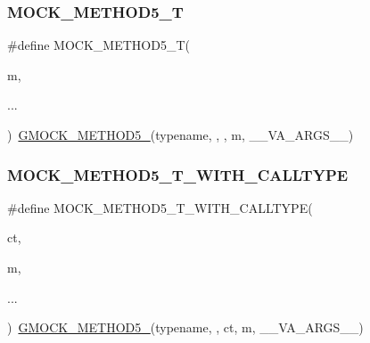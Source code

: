 \mbox{\label{_obj__test_2lib_2googletest-master_2googlemock_2include_2gmock_2gmock-generated-function-mockers_8h_a3566f9bd057c5cee1841f55cbf685947}} 
\subsubsection{\texorpdfstring{MOCK\_METHOD5\_T}{MOCK\_METHOD5\_T}}
{\footnotesize\ttfamily \#define M\+O\+C\+K\+\_\+\+M\+E\+T\+H\+O\+D5\+\_\+T(\begin{DoxyParamCaption}\item[{}]{m,  }\item[{}]{... }\end{DoxyParamCaption})~\mbox{\hyperlink{_obj__test_2lib_2googletest-release-1_88_81_2googlemock_2include_2gmock_2gmock-generated-function-mockers_8h_a9e3ecd392499ab19a4a6d3adcabf56f6}{G\+M\+O\+C\+K\+\_\+\+M\+E\+T\+H\+O\+D5\+\_\+}}(typename, , , m, \+\_\+\+\_\+\+V\+A\+\_\+\+A\+R\+G\+S\+\_\+\+\_\+)}

\mbox{\label{_obj__test_2lib_2googletest-master_2googlemock_2include_2gmock_2gmock-generated-function-mockers_8h_a04f83b372ebe63dea92cb5c3502ff345}} 
\subsubsection{\texorpdfstring{MOCK\_METHOD5\_T\_WITH\_CALLTYPE}{MOCK\_METHOD5\_T\_WITH\_CALLTYPE}}
{\footnotesize\ttfamily \#define M\+O\+C\+K\+\_\+\+M\+E\+T\+H\+O\+D5\+\_\+\+T\+\_\+\+W\+I\+T\+H\+\_\+\+C\+A\+L\+L\+T\+Y\+PE(\begin{DoxyParamCaption}\item[{}]{ct,  }\item[{}]{m,  }\item[{}]{... }\end{DoxyParamCaption})~\mbox{\hyperlink{_obj__test_2lib_2googletest-release-1_88_81_2googlemock_2include_2gmock_2gmock-generated-function-mockers_8h_a9e3ecd392499ab19a4a6d3adcabf56f6}{G\+M\+O\+C\+K\+\_\+\+M\+E\+T\+H\+O\+D5\+\_\+}}(typename, , ct, m, \+\_\+\+\_\+\+V\+A\+\_\+\+A\+R\+G\+S\+\_\+\+\_\+)}

